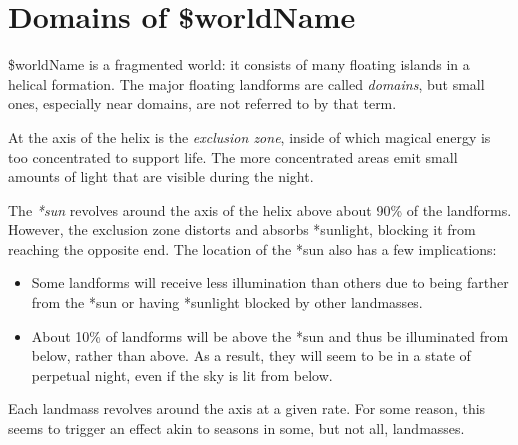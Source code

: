 \documentclass{book}
\newcommand{\wname}{\$worldName}
\begin{document}
\chapter{Domains of \wname}

\wname{} is a fragmented world: it consists of many floating islands in a helical formation. The major floating landforms are called \emph{domains}, but small ones, especially near domains, are not referred to by that term.

At the axis of the helix is the \emph{exclusion zone}, inside of which magical energy is too concentrated to support life. The more concentrated areas emit small amounts of light that are visible during the night.

The \emph{*sun} revolves around the axis of the helix above about 90\% of the landforms. However, the exclusion zone distorts and absorbs *sunlight, blocking it from reaching the opposite end. The location of the *sun also has a few implications:

\begin{itemize}
  \item Some landforms will receive less illumination than others due to being farther from the *sun or having *sunlight blocked by other landmasses.
  \item About 10\% of landforms will be above the *sun and thus be illuminated from below, rather than above. As a result, they will seem to be in a state of perpetual night, even if the sky is lit from below.
\end{itemize}

Each landmass revolves around the axis at a given rate. For some reason, this seems to trigger an effect akin to seasons in some, but not all, landmasses.
\end{document}
